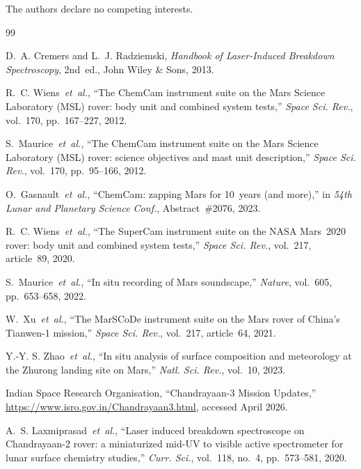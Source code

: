 \documentclass[a4paper,twocolumn,10pt]{article}
\begin{document}
The authors declare no competing interests.


\begin{thebibliography}{99}

D.~A. Cremers and L.~J. Radziemski,
\textit{Handbook of Laser-Induced Breakdown Spectroscopy}, 2nd~ed.,
John Wiley \& Sons, 2013.

R.~C. Wiens~\emph{et~al.},
``The ChemCam instrument suite on the Mars Science Laboratory (MSL)
rover: body unit and combined system tests,''
\textit{Space Sci. Rev.}, vol.~170, pp.~167--227, 2012.

S.~Maurice~\emph{et~al.},
``The ChemCam instrument suite on the Mars Science Laboratory (MSL)
rover: science objectives and mast unit description,''
\textit{Space Sci. Rev.}, vol.~170, pp.~95--166, 2012.

O.~Gasnault~\emph{et~al.},
``ChemCam: zapping Mars for 10~years (and more),''
in \textit{54th Lunar and Planetary Science Conf.}, Abstract~\#2076,
2023.

R.~C. Wiens~\emph{et~al.},
``The SuperCam instrument suite on the NASA Mars~2020 rover: body
unit and combined system tests,''
\textit{Space Sci. Rev.}, vol.~217, article~89, 2020.

S.~Maurice~\emph{et~al.},
``In situ recording of Mars soundscape,''
\textit{Nature}, vol.~605, pp.~653--658, 2022.

W.~Xu~\emph{et~al.},
``The MarSCoDe instrument suite on the Mars rover of China's
Tianwen-1 mission,''
\textit{Space Sci. Rev.}, vol.~217, article~64, 2021.

Y.-Y. S. Zhao~\emph{et~al.},
``In situ analysis of surface composition and meteorology at the
Zhurong landing site on Mars,''
\textit{Natl. Sci. Rev.}, vol.~10, 2023.

Indian Space Research Organisation,
``Chandrayaan-3 Mission Updates,''
\url{https://www.isro.gov.in/Chandrayaan3.html},
accessed April 2026.

A.~S. Laxmiprasad~\emph{et~al.},
``Laser induced breakdown spectroscope on Chandrayaan-2 rover:
a miniaturized mid-UV to visible active spectrometer for lunar surface
chemistry studies,''
\textit{Curr. Sci.}, vol.~118, no.~4, pp.~573--581, 2020.


\end{thebibliography}
\end{document}
